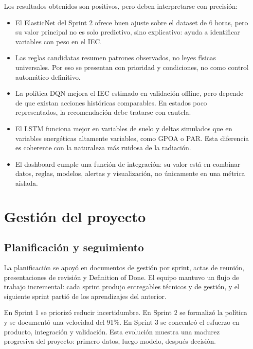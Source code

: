 ﻿\documentclass[11pt,a4paper]{article}
\begin{document}
Los resultados obtenidos son positivos, pero deben interpretarse con precisión:

\begin{itemize}
    \item El ElasticNet del Sprint 2 ofrece buen ajuste sobre el dataset de 6 horas, pero su valor principal no es solo predictivo, sino explicativo: ayuda a identificar variables con peso en el IEC.
    \item Las reglas candidatas resumen patrones observados, no leyes físicas universales. Por eso se presentan con prioridad y condiciones, no como control automático definitivo.
    \item La política DQN mejora el IEC estimado en validación offline, pero depende de que existan acciones históricas comparables. En estados poco representados, la recomendación debe tratarse con cautela.
    \item El LSTM funciona mejor en variables de suelo y deltas simulados que en variables energéticas altamente variables, como GPOA o PAR. Esta diferencia es coherente con la naturaleza más ruidosa de la radiación.
    \item El dashboard cumple una función de integración: su valor está en combinar datos, reglas, modelos, alertas y visualización, no únicamente en una métrica aislada.
\end{itemize}
\newpage

\section{Gestión del proyecto}

\subsection{Planificación y seguimiento}

La planificación se apoyó en documentos de gestión por sprint, actas de reunión, presentaciones de revisión y Definition of Done. El equipo mantuvo un flujo de trabajo incremental: cada sprint produjo entregables técnicos y de gestión, y el siguiente sprint partió de los aprendizajes del anterior.

En Sprint 1 se priorizó reducir incertidumbre. En Sprint 2 se formalizó la política y se documentó una velocidad del 91\%. En Sprint 3 se concentró el esfuerzo en producto, integración y validación. Esta evolución muestra una madurez progresiva del proyecto: primero datos, luego modelo, después decisión.
\end{document}
